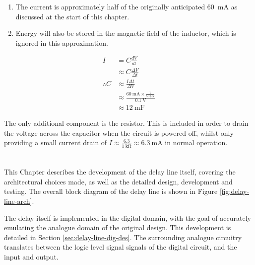\begin{enumerate}
	\item The current is approximately half of the originally anticipated \SI{60}{\milli\ampere} as discussed at the start of this chapter.
	\item Energy will also be stored in the magnetic field of the inductor, which is ignored in this approximation.
\end{enumerate}

\begin{align}
I &= C \frac{dV}{dt} \nonumber \\
&\approx C \frac{\Delta V}{ \Delta t} \nonumber \\
\therefore C &\approx \frac{I \Delta t}{\Delta V} \nonumber \\
&\approx \frac{\SI{60}{\milli\ampere} \times \frac{1}{\SI{50}{\hertz}} }{\SI{0.1}{\volt}} \nonumber \\
&\approx \SI{12}{\milli\farad} \label{eq:delay-line-ripple}
\end{align}

The only additional component is the resistor. This is included in order to drain the voltage across the capacitor when the circuit is powered off, whilst only providing a small current drain of $I \approx \frac{6.3}{\SI{1}{\kilo\ohm}} \approx \SI{6.3}{\milli\ampere}$ in normal operation.

\chapter{} \label{sec:delay-line-des}

This Chapter describes the development of the delay line itself, covering the architectural choices made, as well as the detailed design, development and testing. The overall block diagram of the delay line is shown in Figure \ref{fig:delay-line-arch}.

The delay itself is implemented in the digital domain, with the goal of accurately emulating the analogue domain of the original design. This development is detailed in Section \ref{sec:delay-line-dig-des}. The surrounding analogue circuitry translates between the logic level signal signals of the digital circuit, and the input and output.


